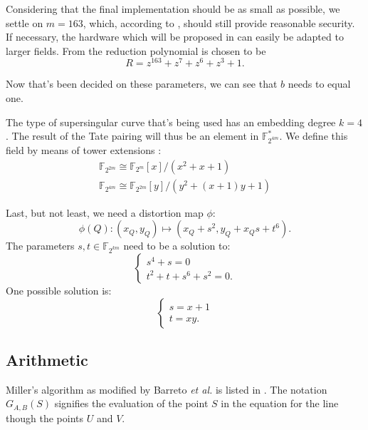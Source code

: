 Considering that the final implementation should be as small as possible, we settle on $m = 163$, which, according to \cite{lenstra}, should still provide reasonable security. If necessary, the hardware which will be proposed in  can easily be adapted to larger fields. From \cite{sec2} the reduction polynomial is chosen to be 
\begin{displaymath}
R = z^{163} + z^7 + z^6 + z^3 + 1.
\end{displaymath}

Now that's been decided on these parameters, we can see that $b$ needs to equal one.

The type of supersingular curve that's being used has an embedding degree $k = 4$. The result of the Tate pairing will thus be an element in $\mathbb{F}_{2^{4 m}}^*$. We define this field by means of tower extensions \cite{bertoni}:
\begin{displaymath}\begin{gathered}
\mathbb{F}_{2^{2 m}} \cong \mathbb{F}_{2^{m}}[x]/\left(x^2 + x + 1\right)\\
\mathbb{F}_{2^{4 m}} \cong \mathbb{F}_{2^{2 m}}[y]/\left(y^2 + (x + 1)y + 1\right)
\end{gathered}\end{displaymath}

Last, but not least, we need a distortion map $\phi$:
\begin{displaymath}
\phi(Q) : (x_Q, y_Q) \mapsto (x_Q + s^2, y_Q + x_Q s + t^6).
\end{displaymath}
The parameters $s, t \in \mathbb{F}_{2^{km}}$ need to be a solution to:
\begin{displaymath}\begin{cases}
s^4 + s = 0\\
t^2 + t + s^6 + s^2 = 0.
\end{cases}\end{displaymath}
One possible solution is:
\begin{displaymath}\begin{cases}
s = x + 1\\
t = xy.
\end{cases}\end{displaymath}


\subsection{Arithmetic}

Miller's algorithm as modified by Barreto \emph{et al.} is listed in . The notation $G_{A,B}(S)$ signifies the evaluation of the point $S$ in the equation for the line though the points $U$ and $V$.

